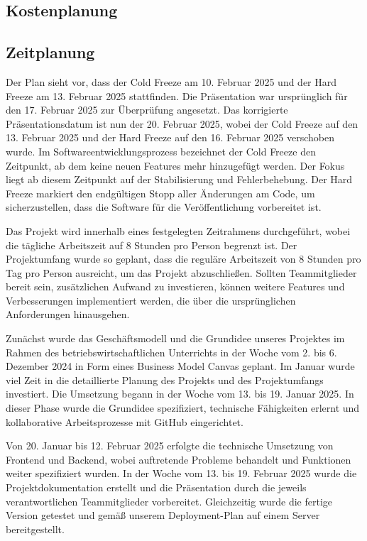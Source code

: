 \documentclass[a4paper,12pt]{article}
\begin{document}
\subsection{Kostenplanung}

\subsection{Zeitplanung}
Der Plan sieht vor, dass der Cold Freeze am 10. Februar 2025 und der Hard Freeze am 13. Februar 2025 stattfinden. Die Präsentation war ursprünglich für den 17. Februar 2025 zur Überprüfung angesetzt. Das korrigierte Präsentationsdatum ist nun der 20. Februar 2025, wobei der Cold Freeze auf den 13. Februar 2025 und der Hard Freeze auf den 16. Februar 2025 verschoben wurde.
Im Softwareentwicklungsprozess bezeichnet der Cold Freeze den Zeitpunkt, ab dem keine neuen Features mehr hinzugefügt werden. Der Fokus liegt ab diesem Zeitpunkt auf der Stabilisierung und Fehlerbehebung. Der Hard Freeze markiert den endgültigen Stopp aller Änderungen am Code, um sicherzustellen, dass die Software für die Veröffentlichung vorbereitet ist.

Das Projekt wird innerhalb eines festgelegten Zeitrahmens durchgeführt, wobei die tägliche Arbeitszeit auf 8 Stunden pro Person begrenzt ist. Der Projektumfang wurde so geplant, dass die reguläre Arbeitszeit von 8 Stunden pro Tag pro Person ausreicht, um das Projekt abzuschließen. Sollten Teammitglieder bereit sein, zusätzlichen Aufwand zu investieren, können weitere Features und Verbesserungen implementiert werden, die über die ursprünglichen Anforderungen hinausgehen.

Zunächst wurde das Geschäftsmodell und die Grundidee unseres Projektes im Rahmen des betriebswirtschaftlichen Unterrichts in der Woche vom 2. bis 6. Dezember 2024 in Form eines Business Model Canvas geplant. Im Januar wurde viel Zeit in die detaillierte Planung des Projekts und des Projektumfangs investiert. Die Umsetzung begann in der Woche vom 13. bis 19. Januar 2025. In dieser Phase wurde die Grundidee spezifiziert, technische Fähigkeiten erlernt und kollaborative Arbeitsprozesse mit GitHub eingerichtet.

Von 20. Januar bis 12. Februar 2025 erfolgte die technische Umsetzung von Frontend und Backend, wobei auftretende Probleme behandelt und Funktionen weiter spezifiziert wurden. In der Woche vom 13. bis 19. Februar 2025 wurde die Projektdokumentation erstellt und die Präsentation durch die jeweils verantwortlichen Teammitglieder vorbereitet. Gleichzeitig wurde die fertige Version getestet und gemäß unserem Deployment-Plan auf einem Server bereitgestellt.
\end{document}
